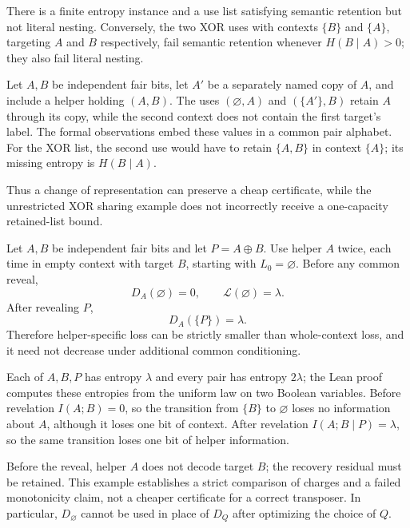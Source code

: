 \begin{proposition}\label{prop:retention-control}
There is a finite entropy instance and a use list satisfying semantic
retention but not literal nesting. Conversely, the two XOR uses with
contexts $\{B\}$ and $\{A\}$, targeting $A$ and $B$ respectively,
fail semantic retention whenever $H(B\mid A)>0$; they also fail literal
nesting.
\end{proposition}
\begin{outline}
Let $A,B$ be independent fair bits, let $A'$ be a separately named
copy of $A$, and include a helper holding $(A,B)$. The uses
$(\varnothing,A)$ and $(\{A'\},B)$ retain $A$ through its copy, while
the second context does not contain the first target's label.
The formal observations embed these values in a common pair alphabet.
For the XOR list, the second use would have to retain $\{A,B\}$ in
context $\{A\}$; its missing entropy is $H(B\mid A)$.
\end{outline}
Thus a change of representation can preserve a cheap certificate, while
the unrestricted XOR sharing example does not incorrectly receive a
one-capacity retained-list bound.

\begin{proposition}\label{prop:conditioning-control}
Let $A,B$ be independent fair bits and let $P=A\oplus B$.
Use helper $A$ twice, each time in empty context with target $B$,
starting with $L_0=\varnothing$. Before any common reveal,
\[
D_A(\varnothing)=0,\qquad \mathcal L(\varnothing)=\lambda.
\]
After revealing $P$,
\[
D_A(\{P\})=\lambda.
\]
Therefore helper-specific loss can be strictly smaller than whole-context
loss, and it need not decrease under additional common conditioning.
\end{proposition}
\begin{outline}
Each of $A,B,P$ has entropy $\lambda$ and every pair has entropy
$2\lambda$; the Lean proof computes these entropies from the uniform
law on two Boolean variables. Before revelation $I(A;B)=0$, so the
transition from $\{B\}$ to $\varnothing$ loses no information about
$A$, although it loses one bit of context. After revelation
$I(A;B\mid P)=\lambda$, so the same transition loses one bit of
helper information.
\end{outline}
Before the reveal, helper $A$ does not decode target $B$; the recovery
residual must be retained. This example establishes a strict comparison
of charges and a failed monotonicity claim, not a cheaper certificate
for a correct transposer. In particular, $D_{\varnothing}$ cannot be
used in place of $D_Q$ after optimizing the choice of $Q$.

